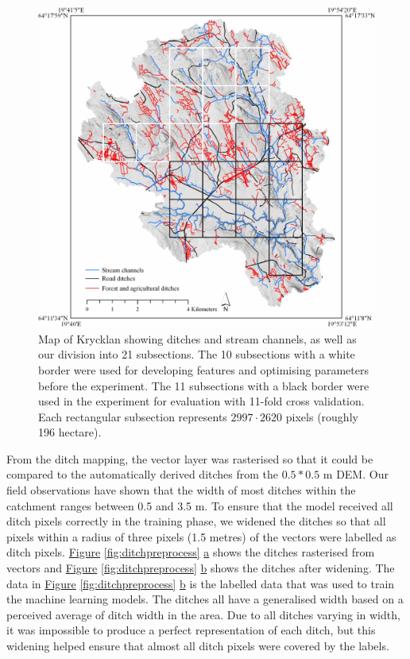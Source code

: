 \documentclass[11pt, review]{elsarticle} %
\begin{document}
\begin{figure}[H]
    \centering
    \includegraphics[width=1\linewidth]{./images/Krycklan_lo.jpg}
    \caption{Map of Krycklan showing ditches and stream channels, as well as our division into 21 subsections. The 10 subsections with a white border were used for developing features and optimising parameters before the experiment. The 11 subsections with a black border were used in the experiment for evaluation with 11-fold cross validation. Each rectangular subsection represents $2997 \cdot 2620$ pixels (roughly 196 hectare).}
    \label{fig:swedenkrycklan}
\end{figure}

From the ditch mapping, the vector layer was rasterised so that it could be compared to the automatically derived ditches from the $0.5*0.5$ m DEM. Our field observations have shown that the  width of most ditches within the catchment ranges between 0.5 and 3.5 m. To ensure that the model received all ditch pixels correctly in the training phase, we widened the ditches so that all pixels within a radius of three pixels (1.5 metres) of the vectors were labelled as ditch pixels. \hyperref[fig:ditchpreprocess]{Figure} \ref{fig:ditchpreprocess} \hyperref[fig:ditchpreprocess]{a} shows the ditches rasterised from vectors and \hyperref[fig:ditchpreprocess]{Figure} \ref{fig:ditchpreprocess} \hyperref[fig:ditchpreprocess]{b} shows the ditches after widening. The data in \hyperref[fig:ditchpreprocess]{Figure} \ref{fig:ditchpreprocess} \hyperref[fig:ditchpreprocess]{b} is the labelled data that was used to train the machine learning models. The ditches all have a generalised width based on a perceived average of ditch width in the area. Due to all ditches varying in width, it was impossible to produce a perfect representation of each ditch, but this widening helped ensure that almost all ditch pixels were covered by the labels.
\end{document}
